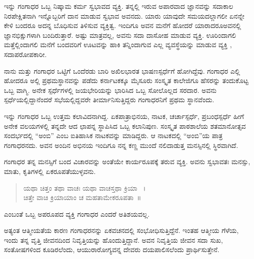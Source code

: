 {ಇನ್ನು ಗಂಗಾಧರ ಒಬ್ಬ ನಿಷ್ಕಾಮ ಕರ್ಮ ಸ್ವಭಾವದ ವ್ಯಕ್ತಿ. ತನ್ನಲ್ಲಿ ಇರುವ ಅಪಾರವಾದ ಜ್ಞಾನವನ್ನು ಸದಾಕಾಲ ನಿರಪೇಕ್ಷಿತನಾಗಿ  ಇನ್ನೊಬ್ಬರಿಗೆ ದಾನ ಮಾಡುವ ಸ್ವಭಾವ ಅವನದು. ಯಾರು ಯಾವುದೇ ಸಮಯದಲ್ಲಾಗಲೀ ಏನನ್ನೇ ಕೇಳಿ ಬಂದರೂ  ಅದನ್ನ ಬೊಧಿಸುವ ತಿಳಿಸುವ ವ್ಯಕ್ತಿತ್ವ.  ಇಂದಿಗೂ ಅವನ ಮನೆಗೆ ಹೋದರೆ ಯಾರಾದರೂ\break  ಅವನಲ್ಲಿ ಜ್ಞಾನಭಿಕ್ಷುಗಳಾಗಿ ಬಂದಿರುತ್ತಾರೆ. ಅಷ್ಟು ಮಾತ್ರವಲ್ಲ, ಅವನು ಸದಾ ದಾಸೋಹ ಮಾಡುವ ವ್ಯಕ್ತಿ. ಊರಿಂದಾಗಲಿ ಮತ್ತೆಲ್ಲಿಂದಾಗಲಿ  ಮನೆಗೆ ಬಂದವರಿಗೆ ಊಟವನ್ನು ಹಾಕಿ ತನ್ನಿಂದಾಗುವ ಎಲ್ಲ ವ್ಯವಸ್ಥೆಯನ್ನು  ಮಾಡುವ ವ್ಯಕ್ತಿ , ಸದಾ\break ಪರೋಪಕಾರೀ.
\vskip 2pt

ನಾನು ಮತ್ತು ಗಂಗಾಧರ ಒಟ್ಟಿಗೆ ಒಂದೆರಡು ಬಾರಿ ಅಖಿಲಭಾರತ ಭಾಷಣ\-ಸ್ಪರ್ಧೆಗೆ ಹೋಗಿದ್ದೆವು. ಗಂಗಾಧರ ಎಲ್ಲಿ ಹೋದರೂ ಅಲ್ಲಿ ಪ್ರಥಮಸ್ಥಾನವನ್ನು ಪಡೆದು ಕರ್ನಾಟಕಕ್ಕೂ ಮೈಸೂರು ಸಂಸ್ಕೃತ ಕಾಲೇಜಿಗೂ ಹೆಸರನ್ನು ತಂದುಕೊಟ್ಟ ಒಬ್ಬ ವಾಗ್ಮಿ. ಅನೇಕ ಸ್ಪರ್ಧೆಗಳಲ್ಲಿ ಜಯಭೇರಿಯನ್ನು ಭಾರಿಸಿದ ಒಬ್ಬ ಸೋಲೊಲ್ಲದ ಸರದಾರ. ಅವನು ಸ್ಪರ್ಧೆಯಲ್ಲಿದ್ದಾನೆಂದರೆ ಸಭೆಯಲ್ಲಿದ್ದವರೇ ತೀರ್ಮಾನಿಸುತ್ತಿದ್ದರು ಗಂಗಾಧರನಿಗೆ ಪ್ರಥಮ ಸ್ಥಾನವೆಂದು. 

ಇನ್ನು ಗಂಗಾಧರ  ಒಬ್ಬ ಉತ್ತಮ ಕಲಾವಿದನಾಗಿದ್ದ. ಏಕಪಾತ್ರಾಭಿನಯ,  ನಾಟಕ,  ಚರ್ಚಾಸ್ಪರ್ಧೆ,  ಪ್ರಬಂಧಸ್ಪರ್ಧೆ ಹೀಗೆ  ಅನೇಕ ವಲಯಗಳಲ್ಲಿ ತನ್ನದೇ ಆದ ಛಾಪನ್ನ ಸ್ಥಾಪಿಸಿದ ಒಬ್ಬ ಕಲಾನಿಪುಣ. ಸಂಸ್ಕೃತ ಪಾಠಶಾಲೆಯ ಶತಮಾನೋತ್ಸವ ಸಂದರ್ಭ\-ದಲ್ಲಿ  “ಅಂಬಿ” ಎಂಬ ಐತಿಹಾಸಿಕ ನಾಟಕವನ್ನು ಮಾಡಿದ್ದರು. ಆ ನಾಟಕದಲ್ಲಿ “ಅಂಬಿ”ಯ ಪಾತ್ರ ಗಂಗಾಧರನದು. ಅವನ ಅಂದಿನ ಅಭಿನಯ ಇಂದಿಗೂ ನನ್ನ ಕಣ್ಣ ಮುಂದೆ \hbox{ನಲಿದಾಡುತ್ತ} ಮನಸ್ಸಿನಲ್ಲಿ ಸ್ಥಿರವಾಗಿದೆ.

ಗಂಗಾಧರ ತನ್ನ ಮನಸ್ಸಿಗೆ ಬಂದ ವಿಚಾರವನ್ನು  ಅಂತೆಯೇ ಕಾರ್ಯರೂಪಕ್ಕೆ ತರುವ ವ್ಯಕ್ತಿ. ಅವನು ಸ್ವಭಾವತಃ  ಮನಸ್ಸು, ಮಾತು, ಕೃತಿಗಳಲ್ಲಿ ಏಕರೂಪತೆಯುಳ್ಳವನು. 

\begin{verse}
ಯಥಾ ಚಿತ್ತಂ  ತಥಾ ವಾಚಃ ಯಥಾ ವಾಚಸ್ತಥಾ ಕ್ರಿಯಾ ~।\\
ಚಿತ್ತೇ ವಾಚಿ ಕ್ರಿಯಾಯಾಂ  ಚ ಮಹತಾಮೇಕರೂಪತಾ~॥
\end{verse}

ಎಂಬಂತೆ ಒಬ್ಬ ಅಪರೂಪದ ವ್ಯಕ್ತಿ ಗಂಗಾಧರ ಎಂದರೆ ಅತಿಶಯವಲ್ಲ.

ಅತ್ಯಂತ ಆತ್ಮೀಯತೆಯ ಕಾರಣ ಗಂಗಾಧರನನ್ನು  ಏಕವಚನದಲ್ಲಿ ಸಂಭೋಧಿಸುತ್ತಿದ್ದೆನೆ. ಇಂತಹ ಆತ್ಮೀಯ ಗೆಳೆಯ,  ಇಂದು ತನ್ನ ವೃತ್ತಿ ಜೀವನದಿಂದ ನಿವೃತ್ತಿಯನ್ನು ಹೊಂದುತ್ತಿದ್ದಾನೆ. ಅವನ ನಿವೃತ್ತಿಯ ಜೀವನ ಸದಾ ಸುಖ, ಸಂತೋಷಗಳಿಂದ ಕೂಡಿರಲೆಂದು, ಆಯುರಾರೋಗ್ಯವನ್ನ ದೇವರು ದಯಪಾಲಿಸಲೆಂದು ಪ್ರಾರ್ಥಿಸುತ್ತೇನೆ. 

\articleend									
}
